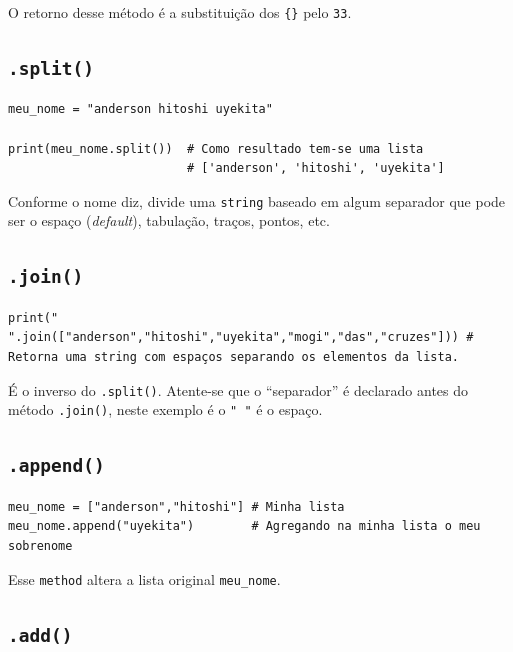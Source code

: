 \documentclass[]{book}
\begin{document}
O retorno desse método é a substituição dos \texttt{\{\}} pelo
\texttt{33}.

\subsection{\texorpdfstring{\texttt{.split()}}{.split()}}\label{split}

\begin{verbatim}
meu_nome = "anderson hitoshi uyekita"

print(meu_nome.split())  # Como resultado tem-se uma lista
                         # ['anderson', 'hitoshi', 'uyekita']
\end{verbatim}

Conforme o nome diz, divide uma \texttt{string} baseado em algum
separador que pode ser o espaço (\emph{default}), tabulação, traços,
pontos, etc.

\subsection{\texorpdfstring{\texttt{.join()}}{.join()}}\label{join}

\begin{verbatim}
print(" ".join(["anderson","hitoshi","uyekita","mogi","das","cruzes"])) # Retorna uma string com espaços separando os elementos da lista.
\end{verbatim}

É o inverso do \texttt{.split()}. Atente-se que o ``separador'' é
declarado antes do método \texttt{.join()}, neste exemplo é o
\texttt{"\ "} é o espaço.

\subsection{\texorpdfstring{\texttt{.append()}}{.append()}}\label{append}

\begin{verbatim}
meu_nome = ["anderson","hitoshi"] # Minha lista
meu_nome.append("uyekita")        # Agregando na minha lista o meu sobrenome
\end{verbatim}

Esse \texttt{method} altera a lista original \texttt{meu\_nome}.

\subsection{\texorpdfstring{\texttt{.add()}}{.add()}}\label{add}
\end{document}
